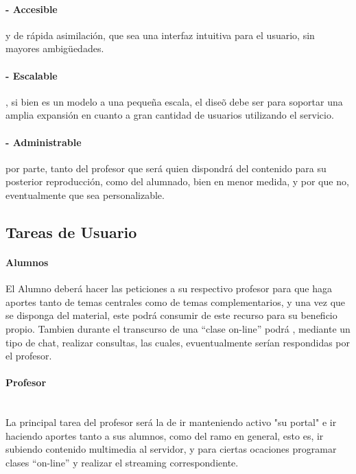 \documentclass[12pt]{article}
\begin{document}
\paragraph{- Accesible} y de rápida asimilación, que sea una interfaz intuitiva para el usuario, sin mayores
ambigüedades.\\

\paragraph{- Escalable}, si bien es un modelo a una peque\~na escala, el dise\~o debe ser para soportar una amplia 
expansión en cuanto a gran cantidad de usuarios utilizando el servicio.\\

\paragraph{- Administrable} por parte, tanto del profesor que será quien dispondrá del contenido para su posterior
reproducción, como del alumnado, bien en menor medida, y por que no, eventualmente que sea personalizable.\\

\subsection{Tareas de Usuario}
\paragraph{Alumnos\\}

El Alumno deberá hacer las peticiones a su respectivo profesor para que haga aportes tanto de temas 
centrales como de temas complementarios, y una vez que se disponga del material, este podrá consumir
de este recurso para su beneficio propio. Tambien durante el transcurso de una ``clase on-line'' podrá ,
mediante un tipo de chat, realizar consultas, las cuales, evuentualmente serían respondidas por el profesor.\\

\paragraph{Profesor\\\\}

La principal tarea del profesor será la de ir manteniendo activo "su portal" e ir haciendo aportes
tanto a sus alumnos, como del ramo en general, esto es, ir subiendo contenido multimedia al servidor,
y para ciertas ocaciones programar clases ``on-line'' y realizar el streaming correspondiente.\\
\end{document}
